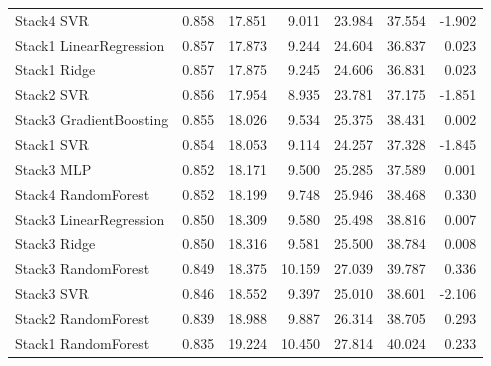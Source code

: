 \begin{longtable}{lrrrrrr}
    Stack4 SVR & 0.858 & 17.851 & 9.011 & 23.984 & 37.554 & -1.902 \\
    Stack1 LinearRegression & 0.857 & 17.873 & 9.244 & 24.604 & 36.837 & 0.023 \\
    Stack1 Ridge & 0.857 & 17.875 & 9.245 & 24.606 & 36.831 & 0.023 \\
    Stack2 SVR & 0.856 & 17.954 & 8.935 & 23.781 & 37.175 & -1.851 \\
    Stack3 GradientBoosting & 0.855 & 18.026 & 9.534 & 25.375 & 38.431 & 0.002 \\
    Stack1 SVR & 0.854 & 18.053 & 9.114 & 24.257 & 37.328 & -1.845 \\
    Stack3 MLP & 0.852 & 18.171 & 9.500 & 25.285 & 37.589 & 0.001 \\
    Stack4 RandomForest & 0.852 & 18.199 & 9.748 & 25.946 & 38.468 & 0.330 \\
    Stack3 LinearRegression & 0.850 & 18.309 & 9.580 & 25.498 & 38.816 & 0.007 \\
    Stack3 Ridge & 0.850 & 18.316 & 9.581 & 25.500 & 38.784 & 0.008 \\
    Stack3 RandomForest & 0.849 & 18.375 & 10.159 & 27.039 & 39.787 & 0.336 \\
    Stack3 SVR & 0.846 & 18.552 & 9.397 & 25.010 & 38.601 & -2.106 \\
    Stack2 RandomForest & 0.839 & 18.988 & 9.887 & 26.314 & 38.705 & 0.293 \\
    Stack1 RandomForest & 0.835 & 19.224 & 10.450 & 27.814 & 40.024 & 0.233 \\
\end{longtable}

